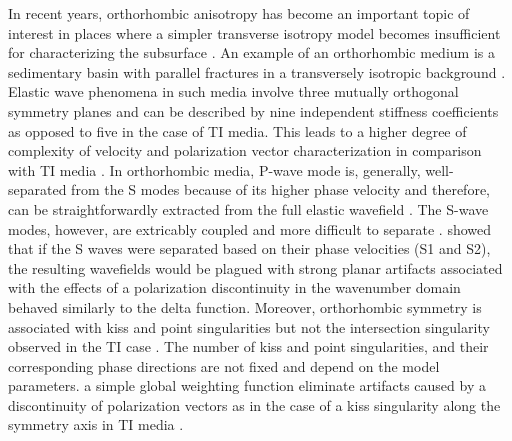 In recent years, orthorhombic anisotropy has become an important topic of interest in places where a simpler transverse isotropy model becomes insufficient for characterizing the subsurface \cite[]{tsvankinortho,tsvankinbook,bakulin2,xu,vascon,grechkabook,thomsenbook,zoneortho,zonedecomp,parameter}. 
An example of an orthorhombic medium is a sedimentary basin with parallel fractures in a transversely isotropic background \cite[]{tsvankin2011book,thomsenbook}. Elastic wave phenomena in such media involve three mutually orthogonal symmetry planes and can be described by nine independent stiffness coefficients as opposed to five in the case of TI media. This  leads to a higher degree of complexity of velocity and polarization vector characterization in comparison with TI media \cite[]{helbig}. In orthorhombic media, P-wave mode is, generally, well-separated from the S modes because of its higher phase velocity and therefore,  can be straightforwardly extracted from the full elastic wavefield \cite[]{joethesis}. The S-wave modes, however, are extricably coupled and more difficult to separate \cite[]{helbig}. \cite{joethesis} showed that if the S waves were separated based on  their phase velocities (S1 and S2), the resulting wavefields would be plagued with strong planar artifacts associated with the effects of a polarization discontinuity  in the wavenumber domain\new{,} behaved similarly to the delta function. Moreover, orthorhombic symmetry is associated with kiss and point singularities but not the intersection singularity observed in the TI case \cite[]{crampyedlin,cramp1984,cramp1991}. The number of kiss and point singularities, and their corresponding phase directions are not fixed and depend on the model parameters.  a simple global weighting function  eliminate artifacts caused by a discontinuity of polarization vectors as in the case of a kiss singularity along the symmetry axis in TI media \cite[]{yantti}.

